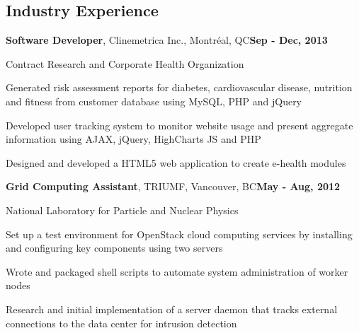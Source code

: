 \documentclass[margin,line]{res}
\newenvironment{list1}{
  \begin{list}{\ding{113}}{
      \setlength{\itemsep}{0in}
      \setlength{\parsep}{0in} \setlength{\parskip}{0in}
      \setlength{\topsep}{0in} \setlength{\partopsep}{0in} 
      \setlength{\leftmargin}{0.17in}}}{\end{list}}
\newenvironment{list3}{
  \begin{list}{\textopenbullet}{
      \setlength{\itemsep}{0in}
      \setlength{\parsep}{0in} \setlength{\parskip}{0in}
      \setlength{\topsep}{0in} \setlength{\partopsep}{0in} 
      \setlength{\leftmargin}{0.1in}}}{\end{list}}
\begin{document}
\begin{resume}
\vspace*{.4cm}

\section{\sc Industry Experience}

{\bf Software Developer}, Clinemetrica Inc., Montr\'eal, QC\hfill{\bf Sep - Dec, 2013}\\
\vspace*{-.2cm}
\begin{list1}
\item[] Contract Research and Corporate Health Organization
\vspace*{.1cm}
\begin{list3}
\item Generated risk assessment reports for diabetes, cardiovascular disease, nutrition and fitness from customer database using MySQL, PHP and jQuery 
\item Developed user tracking system to monitor website usage and present aggregate information using AJAX, jQuery, HighCharts JS and PHP
\item Designed and developed a HTML5 web application to create e-health modules
\end{list3}
\end{list1}
\vspace*{.1cm}

{\bf Grid Computing Assistant}, TRIUMF, Vancouver, BC\hfill{\bf May - Aug, 2012}\\
\vspace*{-.2cm}
\begin{list1}
\item[] National Laboratory for Particle and Nuclear Physics
\vspace*{.1cm}
\begin{list3}
\item Set up a test environment for OpenStack cloud computing services by installing and configuring key components using two servers
\item Wrote and packaged shell scripts to automate system administration of worker nodes
\item Research and initial implementation of a server daemon that tracks external connections to the data center for intrusion detection
\end{list3}
\end{list1}


\end{resume}
\end{document}
